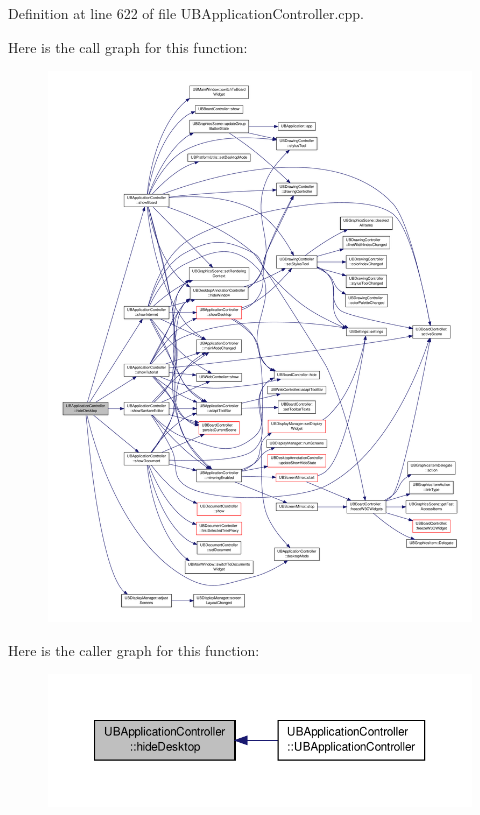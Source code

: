 Definition at line 622 of file U\-B\-Application\-Controller.\-cpp.



Here is the call graph for this function\-:
\nopagebreak
\begin{figure}[H]
\begin{center}
\leavevmode
\includegraphics[width=350pt]{da/d14/class_u_b_application_controller_a59f95b747443497d344b8af0fd231cf4_cgraph}
\end{center}
\end{figure}




Here is the caller graph for this function\-:
\nopagebreak
\begin{figure}[H]
\begin{center}
\leavevmode
\includegraphics[width=350pt]{da/d14/class_u_b_application_controller_a59f95b747443497d344b8af0fd231cf4_icgraph}
\end{center}
\end{figure}


